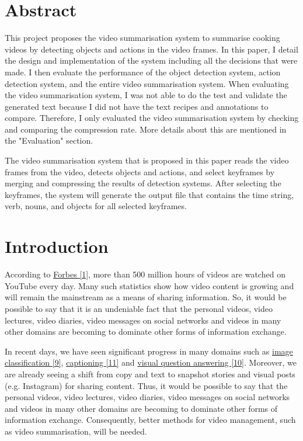 \documentclass{article}
\begin{document}
\newpage

\section*{Abstract}

This project proposes the video summarisation system to summarise cooking videos by detecting objects and actions in the video frames. In this paper, I detail the design and implementation of the system including all the decisions that were made. I then evaluate the performance of the object detection system, action detection system, and the entire video summarisation system. When evaluating the video summarisation system, I was not able to do the test and validate the generated text because I did not have the text recipes and annotations to compare. Therefore, I only evaluated the video summarisation system by checking and comparing the compression rate. More details about this are mentioned in the "Evaluation" section.

The video summarisation system that is proposed in this paper reads the video frames from the video, detects objects and actions, and select keyframes by merging and compressing the results of detection systems. After selecting the keyframes, the system will generate the output file that contains the time string, verb, nouns, and objects for all selected keyframes.

\newpage

\tableofcontents

\newpage

\section{Introduction}

According to \hyperlink{ref1}{Forbes [1]}, more than 500 million hours of videos are watched on YouTube every day. Many such statistics show how video content is growing and will remain the mainstream as a means of sharing information. So, it would be possible to say that it is an undeniable fact that the personal videos, video lectures, video diaries, video messages on social networks and videos in many other domains are becoming to dominate other forms of information exchange.

In recent days, we have seen significant progress in many domains such as \hyperlink{ref9}{image classification [9]}, \hyperlink{ref11}{captioning [11]} and \hyperlink{ref10}{visual question answering [10]}. Moreover, we are already seeing a shift from copy and text to snapshot stories and visual posts (e.g. Instagram) for sharing content. Thus, it would be possible to say that the personal videos, video lectures, video diaries, video messages on social networks and videos in many other domains are becoming to dominate other forms of information exchange. Consequently, better methods for video management, such as video summarisation, will be needed. 
\end{document}
